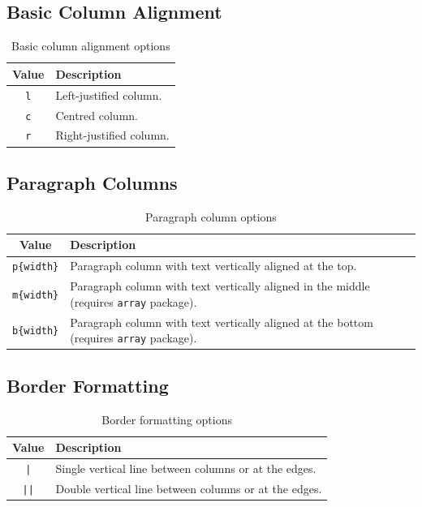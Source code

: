 \documentclass[12pt]{article}
\begin{document}
	\subsection*{Basic Column Alignment}
	\begin{table}[h]
		\centering
		\begin{tabular}{|c|p{10cm}|}
			\hline
			\textbf{Value} & \textbf{Description} \\
			\hline
			\texttt{l} & Left-justified column. \\
			\hline
			\texttt{c} & Centred column. \\
			\hline
			\texttt{r} & Right-justified column. \\
			\hline
		\end{tabular}
		\caption{Basic column alignment options}
		\label{tab:align}
	\end{table}
	
	\subsection*{Paragraph Columns}
	\begin{table}[h]
		\centering
		\begin{tabular}{|c|p{10cm}|}
			\hline
			\textbf{Value} & \textbf{Description} \\
			\hline
			\texttt{p\{width\}} & Paragraph column with text vertically aligned at the top. \\
			\hline
			\texttt{m\{width\}} & Paragraph column with text vertically aligned in the middle (requires \texttt{array} package). \\
			\hline
			\texttt{b\{width\}} & Paragraph column with text vertically aligned at the bottom (requires \texttt{array} package). \\
			\hline
		\end{tabular}
		\caption{Paragraph column options}
		\label{tab:paragraph}
	\end{table}
	
	\subsection*{Border Formatting}
	\begin{table}[h]
		\centering
		\begin{tabular}{|c|p{10cm}|}
			\hline
			\textbf{Value} & \textbf{Description} \\
			\hline
			\texttt{|} & Single vertical line between columns or at the edges. \\
			\hline
			\texttt{||} & Double vertical line between columns or at the edges. \\
			\hline
		\end{tabular}
		\caption{Border formatting options}
		\label{tab:borders}
	\end{table}
	
\end{document}

